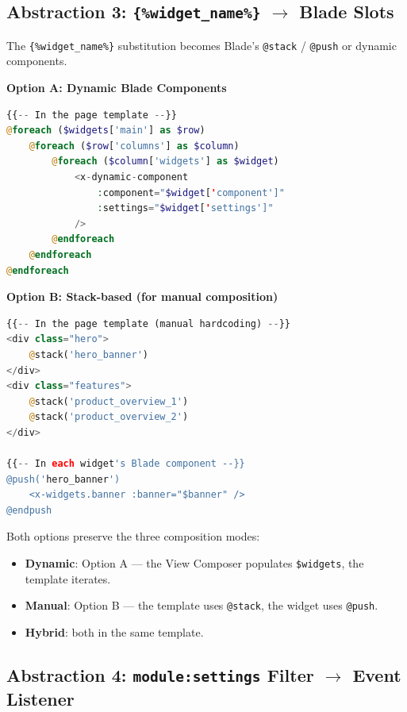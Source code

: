 \documentclass[11pt,a4paper]{article}
\begin{document}
\subsection{Abstraction 3: \texttt{\{\%widget\_name\%\}} $\to$ Blade Slots}

\begin{keybox}
The \texttt{\{\%widget\_name\%\}} substitution becomes Blade's
\texttt{@stack} / \texttt{@push} or dynamic components.

\textbf{Option A: Dynamic Blade Components}

\begin{lstlisting}[language=PHP,basicstyle=\ttfamily\small,numbers=none,frame=none]
{{-- In the page template --}}
@foreach ($widgets['main'] as $row)
    @foreach ($row['columns'] as $column)
        @foreach ($column['widgets'] as $widget)
            <x-dynamic-component
                :component="$widget['component']"
                :settings="$widget['settings']"
            />
        @endforeach
    @endforeach
@endforeach
\end{lstlisting}

\textbf{Option B: Stack-based (for manual composition)}

\begin{lstlisting}[language=PHP,basicstyle=\ttfamily\small,numbers=none,frame=none]
{{-- In the page template (manual hardcoding) --}}
<div class="hero">
    @stack('hero_banner')
</div>
<div class="features">
    @stack('product_overview_1')
    @stack('product_overview_2')
</div>

{{-- In each widget's Blade component --}}
@push('hero_banner')
    <x-widgets.banner :banner="$banner" />
@endpush
\end{lstlisting}

Both options preserve the three composition modes:
\begin{itemize}[leftmargin=1.6em,itemsep=2pt]
  \item \textbf{Dynamic}: Option A --- the View Composer populates
        \texttt{\$widgets}, the template iterates.
  \item \textbf{Manual}: Option B --- the template uses
        \texttt{@stack}, the widget uses \texttt{@push}.
  \item \textbf{Hybrid}: both in the same template.
\end{itemize}
\end{keybox}

\subsection{Abstraction 4: \texttt{module:settings} Filter $\to$ Event Listener}
\end{document}
